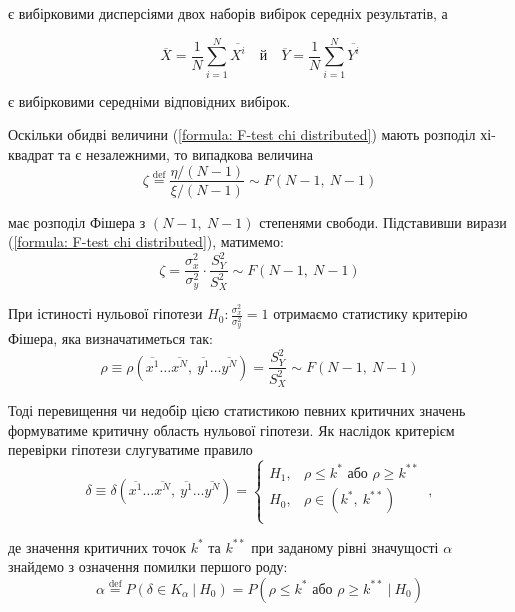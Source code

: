 є вибірковими дисперсіями двох наборів вибірок середніх результатів, а

\begin{equation*}
    \overline{X}=\frac{1}{N}\sum\limits_{i=1}^N \overline{X^i}\quad \text{й} \quad
    \overline{Y}=\frac{1}{N}\sum\limits_{i=1}^N \overline{Y^i}
\end{equation*}

є вибірковими середніми відповідних вибірок.

Оскільки обидві величини (\ref{formula: F-test chi distributed}) мають розподіл хі-квадрат та є незалежними, 
то випадкова величина
\begin{equation*}
    \zeta\overset{\mathrm{def}}{=}\frac{\eta/(N-1)}{\xi/(N-1)}\sim F\left( N-1,\ N-1 \right)
\end{equation*} 

має розподіл Фішера з $\left( N-1,\ N-1 \right)$ степенями свободи. Підставивши вирази 
(\ref{formula: F-test chi distributed}), матимемо:
\begin{equation*}
    \zeta=\frac{\sigma_x^2}{\sigma_y^2}\cdot \frac{S_Y^2}{S_X^2}\sim F\left( N-1,\ N-1 \right)
\end{equation*} 

При істиності нульової гіпотези $H_0: \frac{\sigma_x^2}{\sigma_y^2}=1$ отримаємо статистику критерію Фішера, 
яка визначатиметься так:
\begin{equation}
    \rho\equiv\rho(\overline{ x^1}\ldots \overline{x^N},\ \overline{y^1}\ldots \overline{y^N})=
    \frac{S_Y^2}{S_X^2}\sim F\left( N-1,\ N-1 \right) \label{formula: F-test statistic}
\end{equation}

Тоді перевищення чи недобір цією статистикою певних критичних значень формуватиме критичну область нульової 
гіпотези. Як наслідок критерієм перевірки гіпотези слугуватиме правило
\begin{equation}
    \delta\equiv\delta(\overline{ x^1}\ldots \overline{x^N},\ \overline{y^1}\ldots \overline{y^N})=
    \begin{cases}
        H_1, & \rho\leqslant k^* \text{ або } \rho\geqslant k^{**} \\
        H_0, & \rho\in (k^*,\ k^{**}) \\
    \end{cases}\ , \label{formula: F-test criterion}
\end{equation}

де значення критичних точок $k^*$ та $k^{**}$ при заданому рівні значущості $\alpha$ знайдемо з означення 
помилки першого роду: 
\begin{equation*}
    \alpha\overset{\mathrm{def}}{=}P(\delta\in K_{\alpha}\ |\ H_0)=
    P(\rho\leqslant k^* \text{ або } \rho\geqslant k^{**}\ |\ H_0)
\end{equation*}

